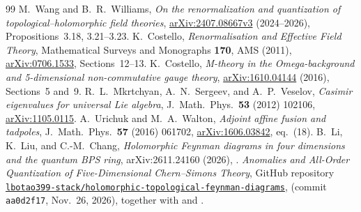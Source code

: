 \documentclass[11pt,letterpaper]{article}
\numberwithin{equation}{section}
\theoremstyle{plain}
\theoremstyle{definition}
\theoremstyle{remark}
\begin{document}
\begin{thebibliography}{99}
\small
{} M.~Wang and B.~R.~Williams, \emph{On the renormalization and quantization of topological--holomorphic field theories}, \href{https://arxiv.org/abs/2407.08667v3}{arXiv:2407.08667v3} (2024--2026), Propositions~3.18, 3.21--3.23.
 K.~Costello, \emph{Renormalisation and Effective Field Theory}, Mathematical Surveys and Monographs \textbf{170}, AMS (2011), \href{https://arxiv.org/abs/0706.1533}{arXiv:0706.1533}, Sections~12--13.
 K.~Costello, \emph{M-theory in the Omega-background and 5-dimensional non-commutative gauge theory}, \href{https://arxiv.org/abs/1610.04144}{arXiv:1610.04144} (2016), Sections~5 and~9.
 R.~L.~Mkrtchyan, A.~N.~Sergeev, and A.~P.~Veselov, \emph{Casimir eigenvalues for universal Lie algebra}, J.\ Math.\ Phys.\ \textbf{53} (2012) 102106, \href{https://arxiv.org/abs/1105.0115}{arXiv:1105.0115}.
 A.~Urichuk and M.~A.~Walton, \emph{Adjoint affine fusion and tadpoles}, J.\ Math.\ Phys.\ \textbf{57} (2016) 061702, \href{https://arxiv.org/abs/1606.03842}{arXiv:1606.03842}, eq.~(18).
 B.~Li, K.~Liu, and C.-M.~Chang, \emph{Holomorphic Feynman diagrams in four dimensions and the quantum BPS ring}, arXiv:2611.24160 (2026), .
 \emph{Anomalies and All-Order Quantization of Five-Dimensional Chern--Simons Theory}, GitHub repository \href{https://github.com/lbotao399-stack/holomorphic-topological-feynman-diagrams}{\texttt{lbotao399-stack/holomorphic-topological-feynman-diagrams}},  (commit \texttt{aa0d2f17}, Nov.~26, 2026), together with  and .
\end{thebibliography}
\end{document}
